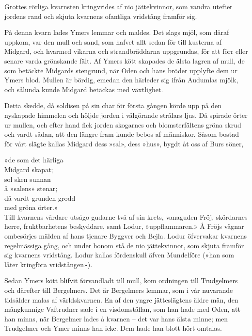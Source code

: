 Grottes rörliga kvarnsten kringvrides af nio jättekvinnor, som vandra
utefter jordens rand och skjuta kvarnens ofantliga vridstång framför
sig.

På denna kvarn lades Ymers lemmar och maldes. Det slags mjöl, som däraf
uppkom, var den mull och sand, som hafvet allt sedan för till kusterna
af Midgard, och hvarmed vikarna och strandbräddarna uppgrundas, för att
förr eller senare varda grönskande fält. Af Ymers kött skapades de älsta
lagren af mull, de som betäckte Midgards stengrund, när Oden och hans
bröder upplyfte dem ur Ymers blod. Mullen är bördig, emedan den härleder
sig ifrån Audumlas mjölk, och sålunda kunde Midgard betäckas med
växtlighet.

Detta skedde, då soldisen på sin char för första gången körde upp på den
nyskapade himmelen och höljde jorden i välgörande strålars ljus. Då
spirade örter ur mullen, och efter hand fick jorden skogarnes och
blomsterfältens gröna skrud och vardt sådan, att den längre fram kunde
bebos af människor. Såsom bostad för vårt slägte kallas Midgard dess
»sal», dess »hus», bygdt åt oss af Burs söner,

{»de som det härliga}\\
{Midgard skapat;}\\
{sol sken sunnan}\\
{å »salens» stenar;}\\
{då vardt grunden grodd}\\
{med gröna örter.»}\\

Till kvarnens vårdare utsågo gudarne två af sin krets, vanaguden Fröj,
skördarnes herre, fruktbarhetens beskyddare, samt Lodur, »uppflammaren.»
Å Fröjs vägnar ombesörjes mälden af hans tjenare Byggver och Bejla.
Lodur öfvervakar kvarnens regelmässiga gång, och under honom stå de
\protect\hypertarget{lb1625905.xhtmlux5cux23start12}{}{}\protect\hypertarget{lb1625905.xhtmlux5cux23start12-a}{}{}\protect\hypertarget{lb1625905.xhtmlux5cux23start12-b}{}{}\protect\hypertarget{lb1625905.xhtmlux5cux23start12-c}{}{}\protect\hypertarget{lb1625905.xhtmlux5cux23start12-d}{}{}
nio jättekvinnor, som skjuta framför sig kvarnens vridstång. Lodur
kallas fördenskull äfven Mundelföre (»han som låter kringföra
vridstången»).

Sedan Ymers kött blifvit förvandladt till mull, kom ordningen till
Trudgelmers och därefter till Bergelmers. Det är Bergelmers lemmar, som
i vår nuvarande tidsålder malas af världskvarnen. En af den yngre
jätteslägtens äldre män, den mångkunnige Vaftrudner sade i en
visdomstäflan, som han hade med Oden, att han minns, när Bergelmer lades
å kvarnen -- det var hans älsta minne; men Trudgelmer och Ymer minns han
icke. Dem hade han blott hört omtalas.


